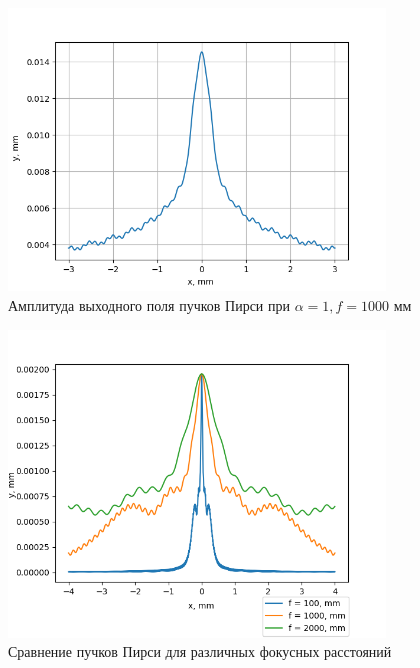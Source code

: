 {    \begin{figure}[H]
        \begin{center}
            \includegraphics[width=10cm]{plots/pearceyoutput3}
            \caption{Амплитуда выходного поля пучков Пирси при $ \alpha  = 1, f = 1000$ мм}
            \label{pearceyoutput3}
        \end{center}
    \end{figure}

    \begin{figure}[H]
        \begin{center}
            \includegraphics[width=10cm]{plots/pe_focus_comparison}
            \caption{Сравнение пучков Пирси для различных фокусных расстояний}
            \label{pe_focus_comparison}
        \end{center}
    \end{figure}

}
